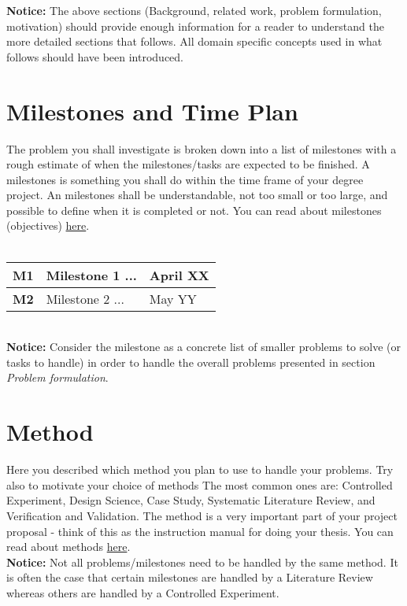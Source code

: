 \documentclass[12pt]{article}
\begin{document}
\noindent
\textbf{Notice:}  The above sections (Background, related work, problem formulation, motivation) should provide enough information for a reader to understand the more detailed sections that follows. All domain specific concepts used in what follows should have been introduced.

\section*{Milestones and Time Plan}
The problem you shall investigate is broken down into a list of milestones with a rough estimate of when the milestones/tasks are expected to be finished. A milestones is something you shall do within the time frame of your degree project.  An milestones shall be understandable, not too small or too large, and possible to define when it is completed or not. You can read about milestones (objectives) \href{https://coursepress.lnu.se/subject/thesis-projects/objectives/}{here}.\\
\\
\begin{tabular} {|p{0.7cm}|p{10cm}|p{1.7cm}|} \hline
\textbf{M1} & Milestone 1 ... & April XX\\ \hline
\textbf{M2} & Milestone 2 ... & May YY\\ \hline
\end{tabular}\\

\noindent
\textbf{Notice:} Consider the milestone as a concrete list of smaller problems to solve (or tasks to handle)  in order to handle the overall problems presented in section \textit{Problem formulation}.

\section*{Method}
Here you described which method you plan to use to handle your problems. Try also to motivate your choice of methods The most common ones are: Controlled Experiment, Design Science, Case Study, Systematic Literature Review, and Verification and Validation. The method is a very important part of your project proposal - think of this as the instruction manual for doing your thesis.  You can read about methods \href{https://coursepress.lnu.se/subject/thesis-projects/method-overview/}{here}.\\

\noindent
\textbf{Notice:}  Not all problems/milestones need to be handled by the same method. It is often the case that certain milestones are handled by a Literature Review whereas others are handled by a Controlled Experiment. 
\end{document}
